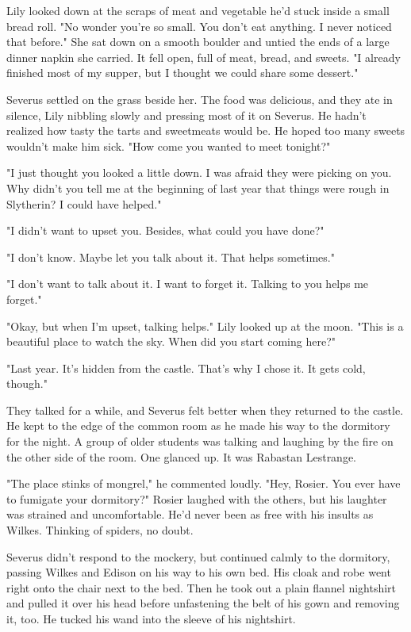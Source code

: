 Lily looked down at the scraps of meat and vegetable he'd stuck inside a small bread roll. "No wonder you're so small. You don't eat anything. I never noticed that before." She sat down on a smooth boulder and untied the ends of a large dinner napkin she carried. It fell open, full of meat, bread, and sweets. "I already finished most of my supper, but I thought we could share some dessert."

Severus settled on the grass beside her. The food was delicious, and they ate in silence, Lily nibbling slowly and pressing most of it on Severus. He hadn't realized how tasty the tarts and sweetmeats would be. He hoped too many sweets wouldn't make him sick. "How come you wanted to meet tonight?"

"I just thought you looked a little down. I was afraid they were picking on you. Why didn't you tell me at the beginning of last year that things were rough in Slytherin? I could have helped."

"I didn't want to upset you. Besides, what could you have done?"

"I don't know. Maybe let you talk about it. That helps sometimes."

"I don't want to talk about it. I want to forget it. Talking to you helps me forget."

"Okay, but when I'm upset, talking helps." Lily looked up at the moon. "This is a beautiful place to watch the sky. When did you start coming here?"

"Last year. It's hidden from the castle. That's why I chose it. It gets cold, though."

They talked for a while, and Severus felt better when they returned to the castle. He kept to the edge of the common room as he made his way to the dormitory for the night. A group of older students was talking and laughing by the fire on the other side of the room. One glanced up. It was Rabastan Lestrange.

"The place stinks of mongrel," he commented loudly. "Hey, Rosier. You ever have to fumigate your dormitory?" Rosier laughed with the others, but his laughter was strained and uncomfortable. He'd never been as free with his insults as Wilkes. Thinking of spiders, no doubt.

Severus didn't respond to the mockery, but continued calmly to the dormitory, passing Wilkes and Edison on his way to his own bed. His cloak and robe went right onto the chair next to the bed. Then he took out a plain flannel nightshirt and pulled it over his head before unfastening the belt of his gown and removing it, too. He tucked his wand into the sleeve of his nightshirt.


